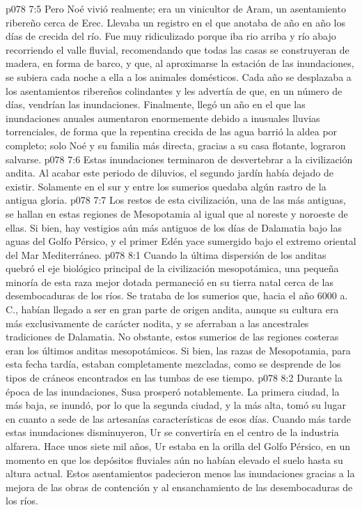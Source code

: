 \vs p078 7:5 Pero Noé vivió realmente; era un vinicultor de Aram, un asentamiento ribereño cerca de Erec. Llevaba un registro en el que anotaba de año en año los días de crecida del río. Fue muy ridiculizado porque iba rio arriba y río abajo recorriendo el valle fluvial, recomendando que todas las casas se construyeran de madera, en forma de barco, y que, al aproximarse la estación de las inundaciones, se subiera cada noche a ella a los animales domésticos. Cada año se desplazaba a los asentamientos ribereños colindantes y les advertía de que, en un número de días, vendrían las inundaciones. Finalmente, llegó un año en el que las inundaciones anuales aumentaron enormemente debido a inusuales lluvias torrenciales, de forma que la repentina crecida de las agua barrió la aldea por completo; solo Noé y su familia más directa, gracias a su casa flotante, lograron salvarse.
\vs p078 7:6 \pc Estas inundaciones terminaron de desvertebrar a la civilización andita. Al acabar este periodo de diluvios, el segundo jardín había dejado de existir. Solamente en el sur y entre los sumerios quedaba algún rastro de la antigua gloria.
\vs p078 7:7 Los restos de esta civilización, una de las más antiguas, se hallan en estas regiones de Mesopotamia al igual que al noreste y noroeste de ellas. Si bien, hay vestigios aún más antiguos de los días de Dalamatia bajo las aguas del Golfo Pérsico, y el primer Edén yace sumergido bajo el extremo oriental del Mar Mediterráneo.
\vs p078 8:1 Cuando la última dispersión de los anditas quebró el eje biológico principal de la civilización mesopotámica, una pequeña minoría de esta raza mejor dotada permaneció en su tierra natal cerca de las desembocaduras de los ríos. Se trataba de los sumerios que, hacia el año 6000 a. C., habían llegado a ser en gran parte de origen andita, aunque su cultura era más exclusivamente de carácter nodita, y se aferraban a las ancestrales tradiciones de Dalamatia. No obstante, estos sumerios de las regiones costeras eran los últimos anditas mesopotámicos. Si bien, las razas de Mesopotamia, para esta fecha tardía, estaban completamente mezcladas, como se desprende de los tipos de cráneos encontrados en las tumbas de ese tiempo.
\vs p078 8:2 Durante la época de las inundaciones, Susa prosperó notablemente. La primera ciudad, la más baja, se inundó, por lo que la segunda ciudad, y la más alta, tomó su lugar en cuanto a sede de las artesanías características de esos días. Cuando más tarde estas inundaciones disminuyeron, Ur se convertiría en el centro de la industria alfarera. Hace unos siete mil años, Ur estaba en la orilla del Golfo Pérsico, en un momento en que los depósitos fluviales aún no habían elevado el suelo hasta su altura actual. Estos asentamientos padecieron menos las inundaciones gracias a la mejora de las obras de contención y al ensanchamiento de las desembocaduras de los ríos.
